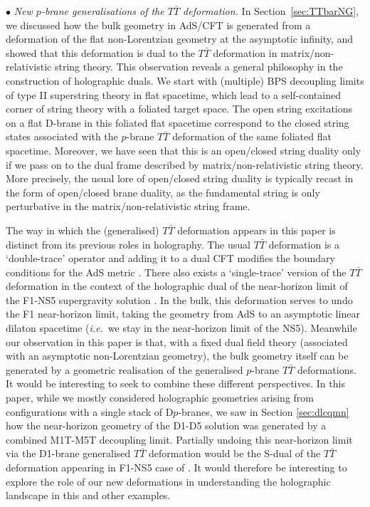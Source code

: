 \documentclass[11pt]{article}
\renewcommand{\emph}[1]{\textit{#1}}
\begin{document}
\vspace{3mm}
\noindent $\bullet$ 
\emph{New $p$-brane generalisations of the $T \bar T$ deformation.}
In Section~\ref{sec:TTbarNG}, we discussed how the bulk geometry in AdS/CFT is generated from a deformation of the flat non-Lorentzian geometry at the asymptotic infinity, and showed that this deformation is dual to the $T\bar{T}$ deformation in matrix/non-relativistic string theory. This observation reveals a general philosophy in the construction of holographic duals. We start with (multiple) BPS decoupling limits of type II superstring theory in flat spacetime, which lead to a self-contained corner of string theory with a foliated target space. The open string excitations on a flat D-brane in this foliated flat spacetime correspond to the closed string states associated with the $p$-brane $T\bar{T}$ deformation of the same foliated flat spacetime. Moreover, we have seen that this is an open/closed string duality only if we pass on to the dual frame described by matrix/non-relativistic string theory. More precisely, the usual lore of open/closed string duality is typically recast in the form of open/closed brane duality, as the fundamental string is only perturbative in the matrix/non-relativistic string frame.  

The way in which the (generalised) $T \bar T$ deformation appears in this paper is distinct from its previous roles in holography.
The usual $T \bar T$ deformation is a `double-trace' operator and adding it to a dual CFT modifies the boundary conditions for the AdS metric \cite{McGough:2016lol,Guica:2019nzm}. 
There also exists a `single-trace' version of the $T \bar T$ deformation in the context of the holographic dual of the near-horizon limit of the F1-NS5 supergravity solution \cite{Giveon:2017nie}. 
In the bulk, this deformation serves to undo the F1 near-horizon limit, taking the geometry from AdS to an asymptotic linear dilaton spacetime (\emph{i.e.}~we stay in the near-horizon limit of the NS5).
Meanwhile our observation in this paper is that, with a fixed dual field theory (associated with an asymptotic non-Lorentzian geometry), the bulk geometry itself can be generated by a geometric realisation of the generalised $p$-brane $T \bar T$ deformations.
It would be interesting to seek to combine these different perspectives.
In this paper, while we mostly considered holographic geometries arising from configurations with a single stack of D$p$-branes, we saw in Section \ref{sec:dlcqmn} how the near-horizon geometry of the D1-D5 solution was generated by a combined M1T-M5T decoupling limit. Partially undoing this near-horizon limit via the D1-brane generalised $T \bar T$ deformation would be the S-dual of the $T \bar T$ deformation appearing in F1-NS5 case of \cite{Giveon:2017nie}. It would therefore be interesting to explore the role of our new deformations in understanding the holographic landscape in this and other examples.
\end{document}

